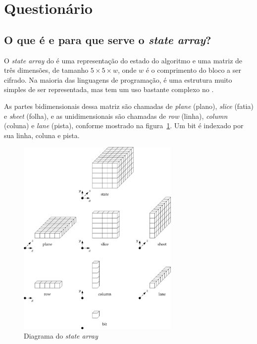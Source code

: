 \section{Questionário}

\let\oldsubsection\thesubsection%
\renewcommand{\thesubsection}{\thesection.\alph{subsection}}

\subsection{O que é e para que serve o \textit{state array}?}

O \textit{state array} do \Keccak é uma representação do estado do algoritmo e
uma matriz de três dimensões, de tamanho $5 \times 5 \times w$, onde $w$ é o
comprimento do bloco a ser cifrado. Na maioria das linguagens de programação,
é uma estrutura muito simples de ser representada, mas tem um uso bastante
complexo no \Keccak.

As partes bidimensionais dessa matriz são chamadas de \textit{plane} (plano),
\textit{slice} (fatia) e \textit{sheet} (folha), e as unidimensionais são
chamadas de \textit{row} (linha), \textit{column} (coluna) e \textit{lane}
(pista), conforme mostrado na figura~\ref{fig:statearray}. Um bit é indexado
por sua linha, coluna e pista.

\begin{figure}[ht]
    \centering
    \includegraphics[width=0.7\textwidth]{images/statearray.png}
    \caption{Diagrama do \textit{state array}}
    \label{fig:statearray}
\end{figure}

